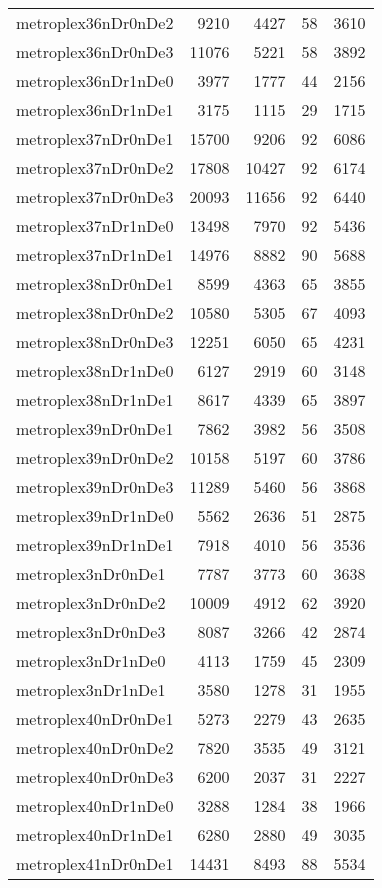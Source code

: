 \begin{longtable}{lrrrr}
metroplex36nDr0nDe2 & 9210 & 4427 & 58 & 3610 \\
metroplex36nDr0nDe3 & 11076 & 5221 & 58 & 3892 \\
metroplex36nDr1nDe0 & 3977 & 1777 & 44 & 2156 \\
metroplex36nDr1nDe1 & 3175 & 1115 & 29 & 1715 \\
metroplex37nDr0nDe1 & 15700 & 9206 & 92 & 6086 \\
metroplex37nDr0nDe2 & 17808 & 10427 & 92 & 6174 \\
metroplex37nDr0nDe3 & 20093 & 11656 & 92 & 6440 \\
metroplex37nDr1nDe0 & 13498 & 7970 & 92 & 5436 \\
metroplex37nDr1nDe1 & 14976 & 8882 & 90 & 5688 \\
metroplex38nDr0nDe1 & 8599 & 4363 & 65 & 3855 \\
metroplex38nDr0nDe2 & 10580 & 5305 & 67 & 4093 \\
metroplex38nDr0nDe3 & 12251 & 6050 & 65 & 4231 \\
metroplex38nDr1nDe0 & 6127 & 2919 & 60 & 3148 \\
metroplex38nDr1nDe1 & 8617 & 4339 & 65 & 3897 \\
metroplex39nDr0nDe1 & 7862 & 3982 & 56 & 3508 \\
metroplex39nDr0nDe2 & 10158 & 5197 & 60 & 3786 \\
metroplex39nDr0nDe3 & 11289 & 5460 & 56 & 3868 \\
metroplex39nDr1nDe0 & 5562 & 2636 & 51 & 2875 \\
metroplex39nDr1nDe1 & 7918 & 4010 & 56 & 3536 \\
metroplex3nDr0nDe1 & 7787 & 3773 & 60 & 3638 \\
metroplex3nDr0nDe2 & 10009 & 4912 & 62 & 3920 \\
metroplex3nDr0nDe3 & 8087 & 3266 & 42 & 2874 \\
metroplex3nDr1nDe0 & 4113 & 1759 & 45 & 2309 \\
metroplex3nDr1nDe1 & 3580 & 1278 & 31 & 1955 \\
metroplex40nDr0nDe1 & 5273 & 2279 & 43 & 2635 \\
metroplex40nDr0nDe2 & 7820 & 3535 & 49 & 3121 \\
metroplex40nDr0nDe3 & 6200 & 2037 & 31 & 2227 \\
metroplex40nDr1nDe0 & 3288 & 1284 & 38 & 1966 \\
metroplex40nDr1nDe1 & 6280 & 2880 & 49 & 3035 \\
metroplex41nDr0nDe1 & 14431 & 8493 & 88 & 5534 \\

\end{longtable}
